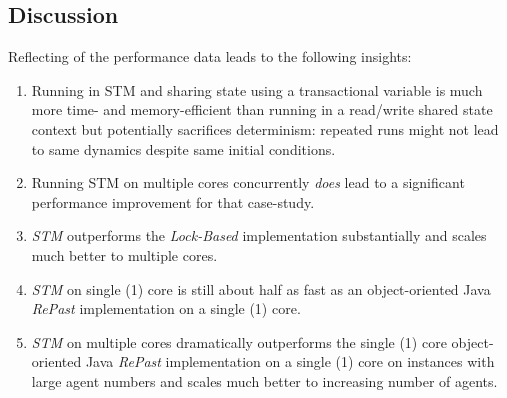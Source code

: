 \subsection{Discussion}
Reflecting of the performance data leads to the following insights:
\begin{enumerate}
	\item Running in STM and sharing state using a transactional variable is much more time- and memory-efficient than running in a read/write shared state context but potentially sacrifices determinism: repeated runs might not lead to same dynamics despite same initial conditions.
	\item Running STM on multiple cores concurrently \textit{does} lead to a significant performance improvement for that case-study.
	\item \textit{STM} outperforms the \textit{Lock-Based} implementation substantially and scales much better to multiple cores.
	\item \textit{STM} on single (1) core is still about half as fast as an object-oriented Java \textit{RePast} implementation on a single (1) core.
	\item \textit{STM} on multiple cores dramatically outperforms the single (1) core object-oriented Java \textit{RePast} implementation on a single (1) core on instances with large agent numbers and scales much better to increasing number of agents.
\end{enumerate}